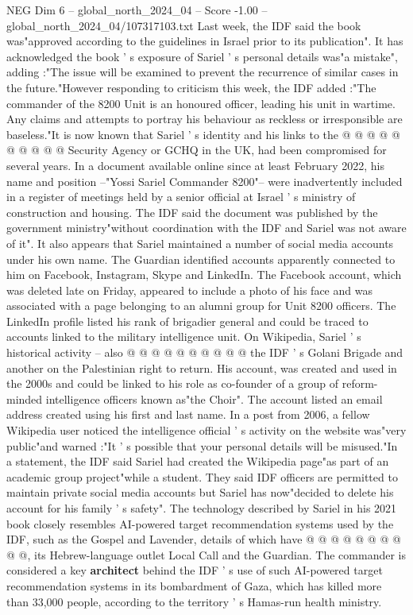 \begin{textsample}{NEG Dim 6 – global\_north\_2024\_04 – Score -1.00 – global\_north\_2024\_04/107317103.txt}
Last week, the IDF said the book was"approved according to the guidelines in Israel prior to its publication".
It has acknowledged the book ' s exposure of Sariel ' s personal details was"a mistake", adding :"The issue will be examined to prevent the recurrence of similar cases in the future."However responding to criticism this week, the IDF added :"The commander of the 8200 Unit is an honoured officer, leading his unit in wartime.
Any claims and attempts to portray his behaviour as reckless or irresponsible are baseless."It is now known that Sariel ' s identity and his links to the @ @ @ @ @ @ @ @ @ @ Security Agency or GCHQ in the UK, had been compromised for several years.
In a document available online since at least February 2022, his name and position --"Yossi Sariel Commander 8200"-- were inadvertently included in a register of meetings held by a senior official at Israel ' s ministry of construction and housing.
The IDF said the document was published by the government ministry"without coordination with the IDF and Sariel was not aware of it".
It also appears that Sariel maintained a number of social media accounts under his own name.
The Guardian identified accounts apparently connected to him on Facebook, Instagram, Skype and LinkedIn.
The Facebook account, which was deleted late on Friday, appeared to include a photo of his face and was associated with a page belonging to an alumni group for Unit 8200 officers.
The LinkedIn profile listed his rank of brigadier general and could be traced to accounts linked to the military intelligence unit.
On Wikipedia, Sariel ' s historical activity -- also @ @ @ @ @ @ @ @ @ @ the IDF ' s Golani Brigade and another on the Palestinian right to return.
His account, was created and used in the 2000s and could be linked to his role as co-founder of a group of reform-minded intelligence officers known as"the Choir".
The account listed an email address created using his first and last name.
In a post from 2006, a fellow Wikipedia user noticed the intelligence official ' s activity on the website was"very public"and warned :"It ' s possible that your personal details will be misused."In a statement, the IDF said Sariel had created the Wikipedia page"as part of an academic group project"while a student.
They said IDF officers are permitted to maintain private social media accounts but Sariel has now"decided to delete his account for his family ' s safety".
The technology described by Sariel in his 2021 book closely resembles AI-powered target recommendation systems used by the IDF, such as the Gospel and Lavender, details of which have @ @ @ @ @ @ @ @ @ @, its Hebrew-language outlet Local Call and the Guardian.
The commander is considered a key \textbf{architect} behind the IDF ' s use of such AI-powered target recommendation systems in its bombardment of Gaza, which has killed more than 33,000 people, according to the territory ' s Hamas-run health ministry.

\end{textsample}
